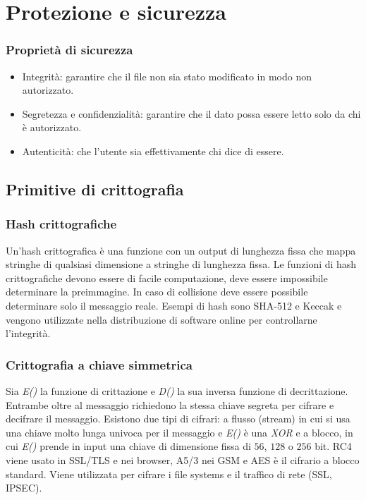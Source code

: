 \chapter{Protezione e sicurezza}
\subsection{Propriet\`a di sicurezza}
\begin{itemize}
	\item Integrit\`a: garantire che il file non sia stato modificato in modo non autorizzato.
	\item Segretezza e confidenzialit\`a: garantire che il dato possa essere letto solo da chi \`e autorizzato.
	\item Autenticit\`a: che l'utente sia effettivamente chi dice di essere.
\end{itemize}
\section{Primitive di crittografia}
\subsection{Hash crittografiche}
Un'hash crittografica \`e una funzione con un output di lunghezza fissa che mappa stringhe di qualsiasi dimensione a stringhe di lunghezza fissa. Le funzioni di hash crittografiche 
devono essere di facile computazione, deve essere impossibile determinare la preimmagine. In caso di collisione deve essere possibile determinare solo il messaggio reale. Esempi di 
hash sono SHA-512 e Keccak e vengono utilizzate nella distribuzione di software online per controllarne l'integrit\`a. 
\subsection{Crittografia a chiave simmetrica}
Sia \emph{E()} la funzione di crittazione e \emph{D()} la sua inversa funzione di decrittazione. Entrambe oltre al messaggio richiedono la stessa chiave segreta per cifrare e decifrare
il messaggio. Esistono due tipi di cifrari: a flusso (stream) in cui si usa una chiave molto lunga univoca per il messaggio e \emph{E()} \`e una \emph{XOR} e a blocco, in cui \emph{E()}
prende in input una chiave di dimensione fissa di $56$, $128$ o $256$ bit. RC4 viene usato in SSL/TLS e nei browser, A5/3 nei GSM e AES \`e il cifrario a blocco standard. Viene 
utilizzata per cifrare i file systems e il traffico di rete (SSL, IPSEC). 
